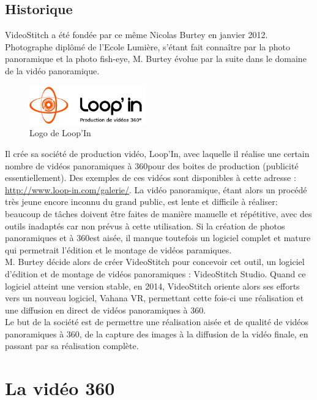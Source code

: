 \subsection{Historique}
VideoStitch a été fondée par ce même Nicolas Burtey en janvier 2012.\\
Photographe diplômé de l'Ecole Lumière, s'étant fait connaître par la photo panoramique 
et la photo fish-eye, M. Burtey évolue par la suite dans le domaine de la vidéo panoramique.\\
\begin{figure}
  \centering
  \includegraphics[width=5cm]{images/loopin.png}
  \caption{Logo de Loop'In}
\end{figure}
Il crée sa société de production vidéo, Loop'In, avec laquelle il réalise une 
certain nombre de vidéos panoramiques à 360\degree pour des boites de production (publicité essentiellement). 
Des exemples de ces vidéos sont disponibles à cette adresse : \url{http://www.loop-in.com/galerie/}.
La vidéo panoramique, étant alors un procédé très jeune encore inconnu du grand public, est 
lente et difficile à réaliser: beaucoup de tâches doivent être faites de manière 
manuelle et répétitive, avec des outils inadaptés car non prévus à cette utilisation.
Si la création de photos panoramiques et à 360\degree est aisée, il manque toutefois 
un logiciel complet et mature qui permetrait l'édition et le montage de vidéos paramiques.\\
\newline
M. Burtey décide alors de créer VideoStitch pour concevoir cet outil, un logiciel 
d'édition et de montage de vidéos panoramiques : VideoStitch Studio.
Quand ce logiciel atteint une version stable, en 2014, VideoStitch oriente alors 
ses efforts vers un nouveau logiciel, Vahana VR, permettant cette fois-ci une réalisation 
et une diffusion en direct de vidéos panoramiques à 360\degree.\\
Le but de la société est de permettre une réalisation aisée et de qualité de vidéos 
panoramiques à 360\degree, de la capture des images à la diffusion de la vidéo finale, 
en passant par sa réalisation complète.


\section{La vidéo 360}
